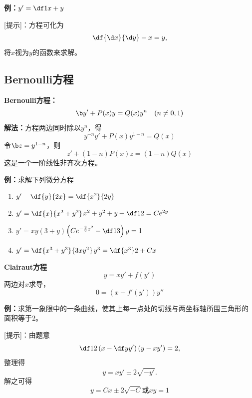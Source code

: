 {\bf 例：}$y'=\df1{x+y}$

[提示]：方程可化为
$$\df{\d x}{\d y}-x=y,$$
将$x$视为$y$的函数来求解。

\subsection{Bernoulli方程}

\begin{thx}
	{\bf Bernoulli方程：}
	$${\b y'+P(x)y=Q(x)y^n\quad(n\ne 0,1)}$$ 
	{\bf 解法：}方程两边同时除以$y^n$，得
	$$y^{-n}y'+P(x)y^{1-n}=Q(x)$$ 
	令${\b z=y^{1-n}}$，则
	$$z'+(1-n)P(x)z=(1-n)Q(x)$$
	这是一个一阶线性非齐次方程。
\end{thx}

{\bf 例：}求解下列微分方程
\begin{enumerate}[(1)]
  \setlength{\itemindent}{1cm}
  \item $y'-\df{y}{2x}=\df{x^2}{2y}$
  \item $y'=\df{x}{x^2+y^2}$\hfill$x^2+y^2+y+\df12=Ce^{2y}$
  \item $y'=xy(3+y)$\hfill$\left(Ce^{-\frac32x^2}-\df13\right)y=1$
  \item $y'=\df{x^3+y^3}{3xy^2}$\hfill$y^3=\df{x^3}2+Cx$
\end{enumerate}

\begin{shaded}
	{\bf Clairaut方程}
	$$y=xy'+f(y')$$
	两边对$x$求导，
	$$0=(x+f'(y'))y''$$
	
	{\bf 例：}求第一象限中的一条曲线，使其上每一点处的切线与两坐标轴所围三角形的
	面积等于$2$。
	
	[提示]：由题意
	$$\df12\left(x-\df y{y'}\right)(y-xy')=2,$$
	整理得
	$$y=xy'\pm2\sqrt{-y'}.$$
	解之可得
	$$y=Cx\pm2\sqrt{-C}\mbox{或}xy=1$$
\end{shaded}

